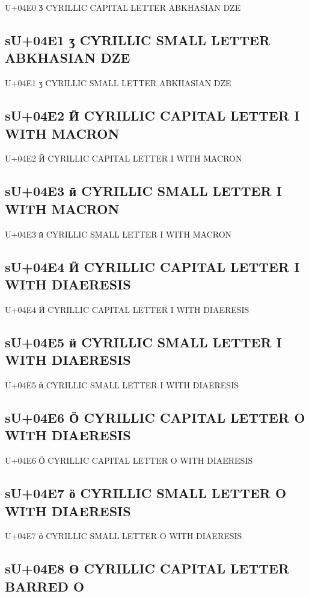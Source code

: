U+04E0 Ӡ  CYRILLIC CAPITAL LETTER ABKHASIAN DZE

\subsection{sU+04E1 ӡ  CYRILLIC SMALL LETTER ABKHASIAN DZE}

U+04E1 ӡ  CYRILLIC SMALL LETTER ABKHASIAN DZE

\subsection{sU+04E2 Ӣ  CYRILLIC CAPITAL LETTER I WITH MACRON}

U+04E2 Ӣ  CYRILLIC CAPITAL LETTER I WITH MACRON

\subsection{sU+04E3 ӣ  CYRILLIC SMALL LETTER I WITH MACRON}

U+04E3 ӣ  CYRILLIC SMALL LETTER I WITH MACRON

\subsection{sU+04E4 Ӥ  CYRILLIC CAPITAL LETTER I WITH DIAERESIS}

U+04E4 Ӥ  CYRILLIC CAPITAL LETTER I WITH DIAERESIS

\subsection{sU+04E5 ӥ  CYRILLIC SMALL LETTER I WITH DIAERESIS}

U+04E5 ӥ  CYRILLIC SMALL LETTER I WITH DIAERESIS

\subsection{sU+04E6 Ӧ  CYRILLIC CAPITAL LETTER O WITH DIAERESIS}

U+04E6 Ӧ  CYRILLIC CAPITAL LETTER O WITH DIAERESIS

\subsection{sU+04E7 ӧ  CYRILLIC SMALL LETTER O WITH DIAERESIS}

U+04E7 ӧ  CYRILLIC SMALL LETTER O WITH DIAERESIS

\subsection{sU+04E8 Ө  CYRILLIC CAPITAL LETTER BARRED O}

